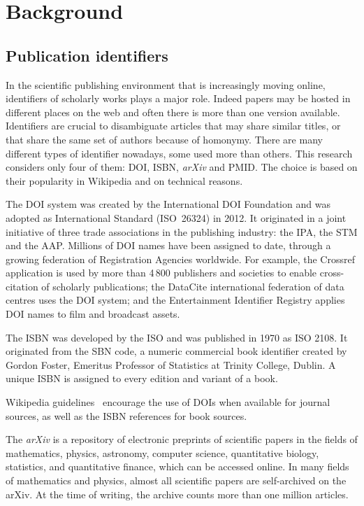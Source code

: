 \cleardoublepage{}
\chapter{Background}
\label{cha:background}

\section{Publication identifiers}
\label{sec:Publication identifiers}
In the scientific publishing environment that is increasingly moving online, identifiers of scholarly works plays a major role.
Indeed papers may be hosted in different places on the web and often there is more than one version available.
Identifiers are crucial to disambiguate articles that may share similar titles, or that  share the same set of authors because of homonymy.
There are many different types of identifier nowadays, some used more than others.
This research considers only four of them: \acs{DOI}, \acs{ISBN}, \emph{arXiv} and \acs{PMID}.
The choice is based on their popularity in Wikipedia and on technical reasons.

The \acf{DOI} system was created by the International DOI Foundation and was adopted as International Standard (ISO~26324) in 2012.
It originated in a joint initiative of three trade associations in the publishing industry: the \acf{IPA}, the \acf{STM} and the \acf{AAP}.
Millions of \ac{DOI} names have been assigned to date, through a growing federation of Registration Agencies worldwide.
For example, the Crossref application is used by more than 4\,800 publishers and societies to enable cross-citation of scholarly publications; the DataCite international federation of data centres uses the \ac{DOI} system; and the Entertainment Identifier Registry applies \ac{DOI} names to film and broadcast assets.

The \acf{ISBN} was developed by the \acf{ISO} and was published in 1970 as ISO 2108.
It originated from the \ac{SBN} code, a numeric commercial book identifier created by Gordon Foster, Emeritus Professor of Statistics at Trinity College, Dublin.
A unique \ac{ISBN} is assigned to every edition and variant of a book.

Wikipedia guidelines~\cite{wiki:doi_guideline} encourage the use of \acp{DOI} when available for journal sources, as well as the \ac{ISBN} references for book sources.

The \emph{arXiv} is a repository of electronic preprints of scientific papers in the fields of mathematics, physics, astronomy, computer science, quantitative biology, statistics, and quantitative finance, which can be accessed online.
In many fields of mathematics and physics, almost all scientific papers are self-archived on the arXiv.
At the time of writing, the archive counts more than one million articles.

